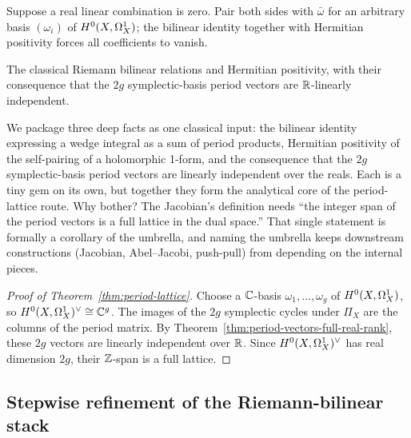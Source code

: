 \begin{proofsketch}
Suppose a real linear combination is zero. Pair both sides with
\(\bar\omega\) for an arbitrary basis \((\omega_i)\) of \(H^{0}(X,\Omega^{1}_{X})\); the
bilinear identity together with Hermitian positivity forces all
coefficients to vanish.
\end{proofsketch}

\begin{theorem}
\label{input:riemann-bilinear}
The classical Riemann bilinear relations and Hermitian positivity, with
their consequence that the \(2g\) symplectic-basis period vectors are
\(\mathbb{R}\)-linearly independent.
\end{theorem}

\begin{layman}
We package three deep facts as one classical input: the bilinear
identity expressing a wedge integral as a sum of period products,
Hermitian positivity of the self-pairing of a holomorphic 1-form, and
the consequence that the \(2g\) symplectic-basis period vectors are
linearly independent over the reals. Each is a tiny gem on its own,
but together they form the analytical core of the period-lattice
route. Why bother? The Jacobian's definition needs ``the integer span
of the period vectors is a full lattice in the dual space.'' That
single statement is formally a corollary of the umbrella, and naming
the umbrella keeps downstream constructions (Jacobian, Abel--Jacobi,
push-pull) from depending on the internal pieces.
\end{layman}

\begin{proof}[Proof of Theorem~\ref{thm:period-lattice}]\leanok
Choose a \(\mathbb{C}\)-basis \(\omega_1,\dots,\omega_g\) of \(H^{0}(X,\Omega^{1}_{X})\), so
\(H^{0}(X,\Omega^{1}_{X})^{\vee}\cong\mathbb{C}^g\). The images of the \(2g\) symplectic cycles under
\(\Pi_X\) are the columns of the period matrix.
By Theorem~\ref{thm:period-vectors-full-real-rank}, these \(2g\) vectors
are linearly independent over \(\mathbb{R}\). Since \(H^{0}(X,\Omega^{1}_{X})^{\vee}\) has real
dimension \(2g\), their \(\mathbb{Z}\)-span is a full lattice.
\end{proof}

\subsection{Stepwise refinement of the Riemann-bilinear stack}
\label{subsec:riemann-bilinear-refinement}

